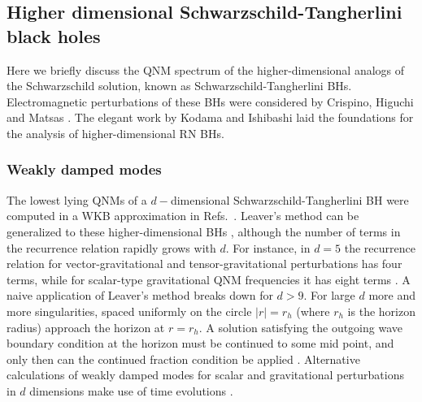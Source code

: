\documentclass[]{iopart}
\begin{document}
\subsection{Higher dimensional Schwarzschild-Tangherlini black holes}
Here we briefly discuss the QNM spectrum of the higher-dimensional analogs of
the Schwarzschild solution, known as Schwarzschild-Tangherlini
BHs. Electromagnetic perturbations of these BHs were considered by Crispino,
Higuchi and Matsas \cite{Crispino:2000jx}. The elegant work by Kodama and
Ishibashi \cite{Kodama:2003jz,Ishibashi:2003ap,Kodama:2003kk} laid the
foundations for the analysis of higher-dimensional RN BHs.

\subsubsection*{Weakly damped modes}
The lowest lying QNMs of a $d-$dimensional Schwarzschild-Tangherlini BH were
computed in a WKB approximation in
Refs.~\cite{Konoplya:2003ii,Konoplya:2003dd,Berti:2003si,Cardoso:2002pa}.
Leaver's method can be generalized to these higher-dimensional BHs
\cite{Cardoso:2003vt,Cardoso:2003qd}, although the number of terms in the
recurrence relation rapidly grows with $d$. For instance, in $d=5$ the
recurrence relation for vector-gravitational and tensor-gravitational
perturbations has four terms, while for scalar-type gravitational QNM
frequencies it has eight terms \cite{Cardoso:2003qd}.  A naive application of
Leaver's method breaks down for $d>9$. For large $d$ more and more
singularities, spaced uniformly on the circle $|r| = r_h$ (where $r_h$ is the
horizon radius) approach the horizon at $r = r_h$. A solution satisfying the
outgoing wave boundary condition at the horizon must be continued to some mid
point, and only then can the continued fraction condition be applied
\cite{Rostworowski:2006bp}. Alternative calculations of weakly damped modes
for scalar and gravitational perturbations in $d$ dimensions make use of time
evolutions \cite{Konoplya:2007jv}.
\end{document}
